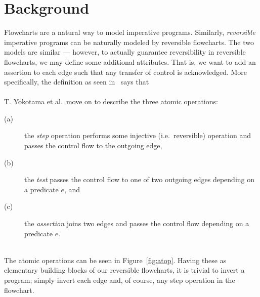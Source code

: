 \chapter*{Background}
%

Flowcharts are a natural way to model imperative programs. Similarly, \textit{reversible} imperative programs can be naturally modeled by reversible flowcharts. The two models are similar --- however, to actually guarantee reversibility in reversible flowcharts, we may define some additional attributes. That is, we want to add an assertion to each edge such that any transfer of control is acknowledged. More specifically, the definition as seen in~\cite{REV} says that \\

 \\

\noindent T. Yokotama et al.\ move on to describe the three atomic operations:\\
\begin{description}
  \item[(a)] the \textit{step} operation performs some injective (i.e.\ reversible) operation and passes the control flow to the outgoing edge,
  \item[(b)] the \textit{test} passes the control flow to one of two outgoing edges depending on a predicate $e$, and
  \item[(c)] the \textit{assertion} joins two edges and passes the control flow depending on a predicate $e$.
\end{description}~\\
\noindent The atomic operations can be seen in Figure~\ref{fig:atop}. Having these as elementary building blocks of our reversible flowcharts, it is trivial to invert a program; simply invert each edge and, of course, any step operation in the flowchart.

